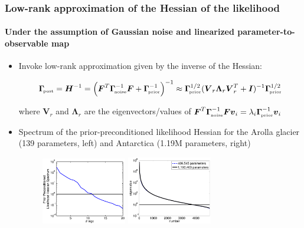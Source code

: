 \documentclass[10pt,final,xcolor=dvipsnames]{beamer}
\newcommand{\ncov} {\bs{\Gamma}_{\!\mbox{\tiny noise}} }
\newcommand{\prcov} {\bs{\Gamma}_{\!\mbox{\tiny prior}} }
\newcommand{\postcov} {\bs{\Gamma}_{\!\mbox{\tiny post}} }
\newcommand{\bs}[1]{\ensuremath{\boldsymbol{#1}}}
\DeclareMathOperator{\diag}{diag}
\newcommand{\Hmatrix}{\bs{H}}
\begin{document}
\begin{frame}
\frametitle{Low-rank approximation of the Hessian of the likelihood}

\framesubtitle{Under the assumption of Gaussian noise and linearized
  parameter-to-observable map}

\begin{itemize}

\item Invoke low-rank approximation  given by the inverse of the Hessian:
  \begin{minipage}{0.9\textwidth}
  \begin{block}{}
    \vspace{-0.5cm} 
    \[
    \postcov = \Hmatrix^{-1} =
    \left ( {\bs{F}^T\ncov^{-1}\bs{F}} + \prcov^{-1} \right)^{-1}
    \approx \prcov^{1/2} (\bs{V}_r \bs{\Lambda}_r \bs{V}^T_r + \bs{I})^{-1}
    \prcov^{1/2} 
    \]
  \end{block}
  \end{minipage}

  \vspace{0.15in}
  where $\bs{V}_r$ and $\bs{\Lambda}_r$ are the eigenvectors/values of
$\bs{F}^T\ncov^{-1}\bs{F} \bs{v}_i = \lambda_i \prcov^{-1} \bs{v}_i $

\item Spectrum of the prior-preconditioned likelihood Hessian for the
  Arolla glacier (139 parameters, left) and
  Antarctica (1.19M parameters, right) 
%
\begin{figure}[htb]
    \centering\includegraphics[width=0.35\textwidth]{extraplots/spectrum.pdf}
    \hspace{0.2in}
    \centering\includegraphics[width=0.35\textwidth]{extraplots/spec_ppmisfit_hess_coarseandfine_new.pdf}
  \end{figure}
\end{itemize}
\end{frame}
\end{document}
